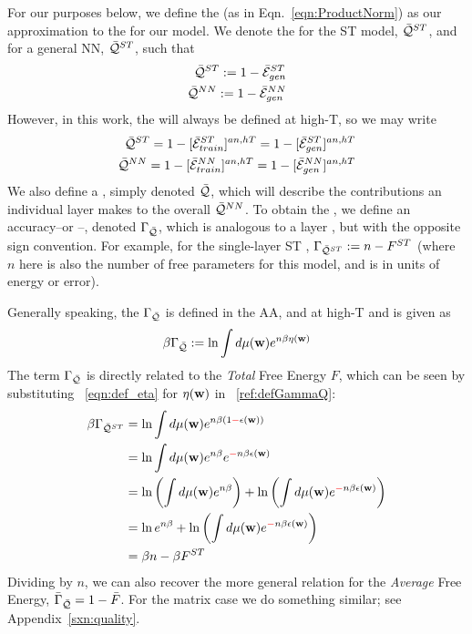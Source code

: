 For our purposes below, we define the \ModelQuality (as in Eqn.~\ref{eqn:ProductNorm}) as our approximation to the
\AverageGeneralizationAccuracy for our model. 
We denote the \ModelQuality for the ST \Perceptron model, $\bar{\mathcal{Q}}^{ST}$,
and for a general NN, $\bar{\mathcal{Q}}^{ST}$, such that
\begin{align}
  \label{eqn:model_pre_qualities}
\bar{\mathcal{Q}}^{ST}:=1-\bar{\mathcal{E}}_{gen}^{ST}  \\ 
\bar{\mathcal{Q}}^{NN}:=1-\bar{\mathcal{E}}_{gen}^{NN}  
\end{align}
However, in this work, the \Quality will always be defined at high-T, so we may write
\begin{align}
  \label{eqn:model_qualities}
  \bar{\mathcal{Q}}^{ST}=1-[\bar{\mathcal{E}}_{train}^{ST}]^{an,hT}=1-[\bar{\mathcal{E}}_{gen}^{ST}]^{an,hT} \\
  \bar{\mathcal{Q}}^{NN}=1-[\bar{\mathcal{E}}_{train}^{NN}]^{an,hT}=1-[\bar{\mathcal{E}}_{gen}^{NN}]^{an,hT} \\
\end{align}
We also define a \LayerQuality, simply denoted $\bar{\mathcal{Q}}$,
which will describe the contributions an individual layer makes to the overall \ModelQuality $\bar{\mathcal{Q}}^{NN}$.
To obtain the \LayerQuality, we define an accuracy--or \Quality--\GeneratingFunction, denoted $\Gamma_{\bar{\mathcal{Q}}}$, which
is analogous to a layer \FreeEnergy, but with the opposite sign convention.
For example, for the single-layer ST \Perceptron, $\Gamma_{\bar{\mathcal{Q}}^{ST}}:=n-F^{ST}$
(where $n$ here is also the number of free parameters for this model, and is in units of energy or error).

Generally speaking, the \Quality \GeneratingFunction $\Gamma_{\bar{\mathcal{Q}}}$ is defined in the AA, and at high-T and is given as
\begin{align}
  \label{ref:defGammaQ}
  \beta\Gamma_{\bar{\mathcal{Q}}} := \ln\int d\mu({\mathbf{w}}) e^{n\beta\eta({\mathbf{w}})}
\end{align}
The term $\Gamma_{\bar{\mathcal{Q}}}$ is directly related to the \emph{Total} Free Energy $F$, which can be seen by substituting \EQN~\ref{eqn:def_eta}
for $\eta({\mathbf{w}})$ in \EQN~\ref{ref:defGammaQ}:
\begin{align}
  \label{ref:defGammaQtoF}
  \beta\Gamma_{\bar{\mathcal{Q}}^{ST}}
  &= \ln\int d\mu({\mathbf{w}}) e^{n\beta(1{\color{red}\sf{-}}\epsilon({\mathbf{w}}))} \\ \nonumber
    &= \ln\int d\mu({\mathbf{w}}) e^{n\beta}e^{{\color{red}\sf{-}}n\beta\epsilon({\mathbf{w}})} \\ \nonumber
    &= \ln\left(\int d\mu({\mathbf{w}}) e^{n\beta}\right)+\ln\left(\int d\mu({\mathbf{w}})e^{{\color{red}\sf{-}}n\beta\epsilon({\mathbf{w}})}\right) \\ \nonumber
   &= \ln e^{n\beta}+\ln\left(\int d\mu({\mathbf{w}})e^{{\color{red}\sf{-}}n\beta\epsilon({\mathbf{w}})}\right) \\ \nonumber
  &= \beta n-\beta F^{ST}
\end{align}
Dividing by $n$, we can also recover the more general relation for the \emph{Average} Free Energy,
$\bar{\Gamma}_{\bar{\mathcal{Q}}}=1-\bar{F}$. For the matrix case we do something similar; see Appendix~\ref{sxn:quality}.


